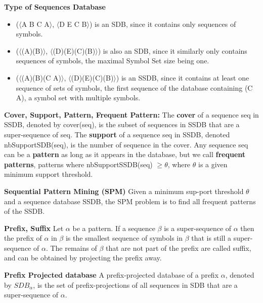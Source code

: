\documentclass{eplmastersthesis}
\begin{document}
\begin{example}{\bfseries Type of Sequences Database}
\begin{itemize}
\item ($\langle$A B C A$\rangle$, $\langle$D E C B$\rangle$) is an SDB, since it contains only sequences of symbols.
\item ($\langle$(A)(B)$\rangle$, $\langle$(D)(E)(C)(B)$\rangle$) is also an SDB, since it similarly only contains sequences of symbols, the maximal Symbol Set size being one. 
\item ($\langle$(A)(B)(C A)$\rangle$, $\langle$(D)(E)(C)(B)$\rangle$) is an SSDB, since it contains at least one sequence of sets of symbols, the first sequence of the database containing (C A), a symbol set with multiple symbols.
\end{itemize}
\end{example}

\begin{definition}{\bfseries Cover, Support, Pattern, Frequent Pattern:}
The \textbf{cover} of a sequence seq in SSDB, denoted by cover(seq), is the subset of sequences in SSDB that are a super-sequence of seq. 
The \textbf{support} of a sequence seq in SSDB, denoted nbSupportSDB(seq), is the number of sequence in the cover. 
Any sequence seq can be a \textbf{pattern} as long as it appears in the database, but we call \textbf{frequent patterns}, patterns where nbSupportSSDB(seq) $\geq \theta$, where $\theta$ is a
given minimum support threshold.
\end{definition}

\begin{definition}{\bfseries Sequential Pattern Mining (SPM)}
Given a minimum sup-port threshold $\theta$ and a sequence database SSDB, the SPM problem is to find all frequent patterns of the SSDB.
\end{definition}

\begin{definition}{\bfseries Prefix, Suffix}
Let $\alpha$ be a pattern. If a sequence  $\beta$ is a super-sequence of $\alpha$ then the prefix of $\alpha$ in $\beta$ is the smallest sequence of symbols in $\beta$ that is still a super-sequence of $\alpha$. The remains of $\beta$ that are not part of the prefix are called suffix, and can be obtained by projecting the prefix away.
\end{definition}

\begin{definition}{\bfseries Prefix Projected database}
A prefix-projected database of a prefix $\alpha$, denoted by $SDB_\alpha$, is the set of prefix-projections of all sequences in SDB that are a super-sequence of $\alpha$.
\end{definition}
\end{document}
